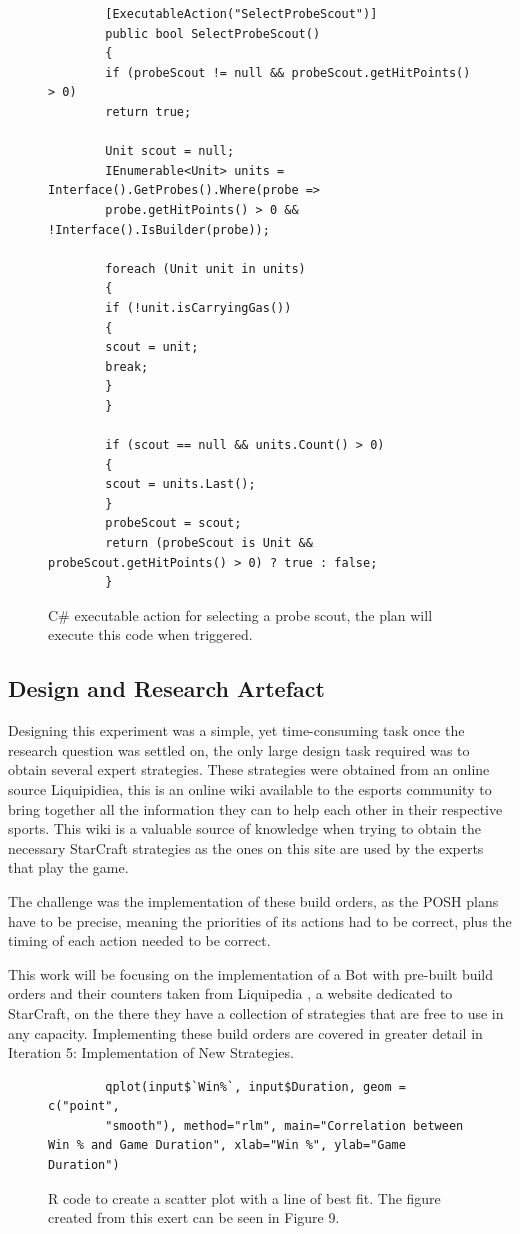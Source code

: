\documentclass[journal]{IEEEtran}
\begin{document}
	\begin{figure}
		\begin{lstlisting}
		[ExecutableAction("SelectProbeScout")]
		public bool SelectProbeScout()
		{
		if (probeScout != null && probeScout.getHitPoints() > 0)
		return true;
		
		Unit scout = null;
		IEnumerable<Unit> units = Interface().GetProbes().Where(probe =>
		probe.getHitPoints() > 0 && !Interface().IsBuilder(probe));
		
		foreach (Unit unit in units)
		{
		if (!unit.isCarryingGas())
		{
		scout = unit;
		break;
		}
		}
		
		if (scout == null && units.Count() > 0)
		{
		scout = units.Last();
		}
		probeScout = scout;
		return (probeScout is Unit && probeScout.getHitPoints() > 0) ? true : false;
		}
		\end{lstlisting}
		\caption{C\# executable action for selecting a probe scout, the plan will execute this code when triggered.}
		\label{Fi4}
	\end{figure}
	
	\subsection{Design and Research Artefact}
	Designing this experiment was a simple, yet time-consuming task once the research question was settled on, the only large design task required was to obtain several expert strategies. These strategies were obtained from an online source Liquipidiea, this is an online wiki available to the esports community to bring together all the information they can to help each other in their respective sports. This wiki is a valuable source of knowledge when trying to obtain the necessary StarCraft strategies as the ones on this site are used by the experts that play the game. 
	
	The challenge was the implementation of these build orders, as the POSH plans have to be precise, meaning the priorities of its actions had to be correct, plus the timing of each action needed to be correct. 
	
	This work will be focusing on the implementation of a Bot with pre-built build orders and their counters taken from Liquipedia \cite{Liquid}, a website dedicated to StarCraft, on the there they have a collection of strategies that are free to use in any capacity. Implementing these build orders are covered in greater detail in Iteration 5: Implementation of New Strategies.
	
	\begin{figure}[H]
		\begin{lstlisting}
		qplot(input$`Win%`, input$Duration, geom = c("point",
		"smooth"), method="rlm", main="Correlation between Win % and Game Duration", xlab="Win %", ylab="Game Duration")
		\end{lstlisting}
		\caption{R code to create a scatter plot with a line of best fit. The figure created from this exert can be seen in Figure 9.}
		\label{Fig3}
	\end{figure}
	
\end{document}
